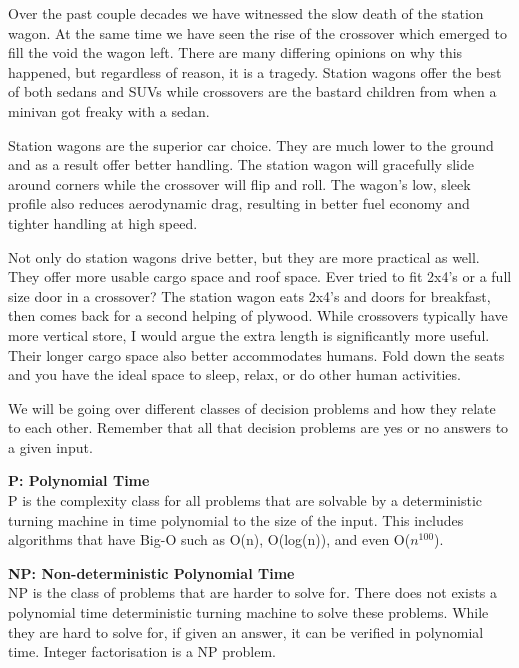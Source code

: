 \documentclass[9pt]{extarticle} %
\begin{document}
\begin{minipage}[t]{.53\linewidth} %
\vspace{-0.4cm}
\hypertarget{firstnews}{}

Over the past couple decades we have witnessed the slow death of the station
wagon. At the same time we have seen the rise of the crossover which emerged
to fill the void the wagon left. There are many differing opinions on why
this happened, but regardless of reason, it is a tragedy. Station wagons offer
the best of both sedans and SUVs while crossovers are the bastard children from
when a minivan got freaky with a sedan.

Station wagons are the superior car choice. They are much lower to the ground
and as a result offer better handling. The station wagon will gracefully slide
around corners while the crossover will flip and roll. The wagon's low, sleek
profile also reduces aerodynamic drag, resulting in better fuel economy and
tighter handling at high speed.

Not only do station wagons drive better, but they are more practical as
well. They offer more usable cargo space and roof space. Ever tried to fit 2x4's
or a full size door in a crossover? The station wagon eats 2x4's and doors for
breakfast, then comes back for a second helping of plywood. While crossovers
typically have more vertical store, I would argue the extra length is
significantly more useful. Their longer cargo space also better accommodates
humans. Fold down the seats and you have the ideal space to sleep, relax, or do
other human activities.


\hypertarget{secondnews}{} 

We will be going over different classes of decision problems and how they relate
to each other. Remember that all that decision problems are yes or no answers to
a given input.

\textbf{P: Polynomial Time} \\
P is the complexity class for all problems that are solvable by a deterministic
turning machine in time polynomial to the size of the input. This includes
algorithms that have Big-O such as O(n), O(log(n)), and even O($n^{100}$).

\textbf{NP: Non-deterministic Polynomial Time} \\
NP is the class of problems that are harder to solve for. There does not exists
a polynomial time deterministic turning machine to solve these problems. While
they are hard to solve for, if given an answer, it can be verified in polynomial
time. Integer factorisation is a NP problem.


\end{minipage}
\end{document}
